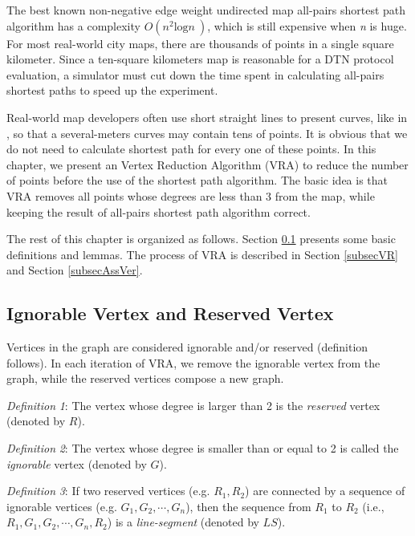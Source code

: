 The best known non-negative edge weight undirected map all-pairs shortest path algorithm \cite{C33} has a complexity $O\left(n^2{\mathrm{log} n\ }\right)$, which is still expensive when \textit{n} is huge. For most real-world city maps, there are thousands of points in a single square kilometer. Since a ten-square kilometers map is reasonable for a DTN protocol evaluation, a simulator must cut down the time spent in calculating all-pairs shortest paths to speed up the experiment.

Real-world map developers often use short straight lines to present curves, like in \cite{C34}, so that a several-meters curves may contain tens of points. It is obvious that we do not need to calculate shortest path for every one of these points. In this chapter, we present an Vertex Reduction Algorithm (VRA) to reduce the number of points before the use of the shortest path algorithm. The basic idea is that VRA removes all points whose degrees are less than 3 from the map, while keeping the result of all-pairs shortest path algorithm correct.

The rest of this chapter is organized as follows. Section \ref{subsecIVRV} presents some basic definitions and lemmas. The process of VRA is described in Section \ref{subsecVR} and Section \ref{subsecAssVer}.



\subsection{ Ignorable Vertex and Reserved Vertex}\label{subsecIVRV}

\noindent Vertices in the graph are considered ignorable and/or reserved (definition follows). In each iteration of VRA, we remove the ignorable vertex from the graph, while the reserved vertices compose a new graph.

\textit{Definition} \textit{1}: The vertex whose degree is larger than 2 is the \textit{reserved} vertex (denoted by $R$).

\textit{Definition} \textit{2}: The vertex whose degree is smaller than or equal to 2 is called the \textit{ignorable} vertex (denoted by $G$).

\textit{Definition} \textit{3}: If two reserved vertices (e.g. $R_1,R_2$) are connected by a sequence of ignorable vertices (e.g. $G_1,G_2,\mathrm{\cdots },G_n$), then the sequence from $R_1$ to $R_2$ (i.e., $R_1,G_1,G_2,\mathrm{\cdots },G_n,R_2$) is a \textit{line-segment} (denoted by $LS$). 

